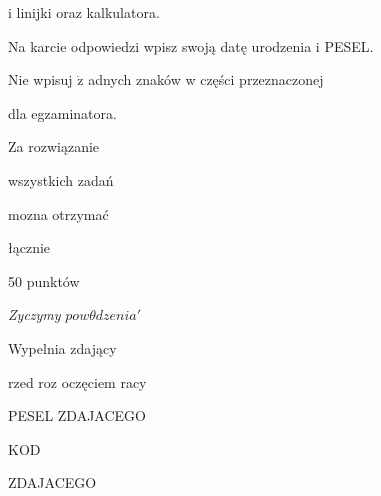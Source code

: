 \documentclass[a4paper,12pt]{article}
\begin{document}
i linijki oraz kalkulatora.

Na karcie odpowiedzi wpisz swoją datę urodzenia i PESEL.

Nie wpisuj $\dot{\mathrm{z}}$ adnych znaków w części przeznaczonej

dla egzaminatora.

Za rozwiązanie

wszystkich zadań

mozna otrzymać

łącznie

50 punktów

{\it Zyczymy} $pow\theta dzenia'$

Wypelnia zdający

rzed roz oczęciem racy

PESEL ZDAJACEGO

KOD

ZDAJACEGO
\end{document}
